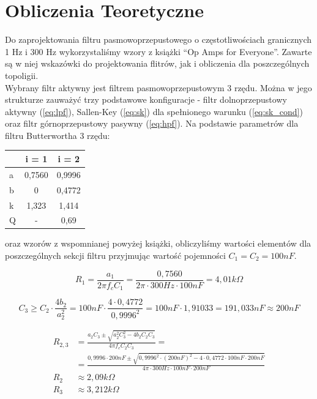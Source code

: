     \section{Obliczenia Teoretyczne}
    \label{sec:calculations}
Do zaprojektowania filtru pasmowoprzepustowego o częstotliwościach 
granicznych 1 Hz i 300 Hz wykorzystaliśmy wzory z książki ``Op Amps for 
Everyone''\cite{SLOA088}. Zawarte są w niej wskazówki do projektowania 
flitrów, jak i obliczenia dla poszczególnych topoligii. \\

Wybrany filtr aktywny jest filtrem pasmowoprzepustowym 3 rzędu. Można 
w jego strukturze zauważyć trzy podstawowe konfiguracje - filtr 
dolnoprzepustowy aktywny (\ref{eq:lpf}), Sallen-Key (\ref{eq:sk}) 
dla spełnionego warunku (\ref{eq:sk_cond}) 
oraz filtr górnoprzepustowy pasywny (\ref{eq:hpf}). 
Na podstawie parametrów dla filtru Butterwortha 3 rzędu: 
\begin{table}[H]
\centering
\renewcommand{\arraystretch}{1.2}
\begin{tabular}{|l|c|c|}
\hline
\textbf{} & \textbf{i = 1} & \textbf{i = 2} \\
\hline
a & 0,7560 & 0,9996 \\
\hline
b & 0 & 0,4772 \\
\hline
k & 1,323 & 1,414 \\
\hline
Q & - & 0,69 \\
\hline
\end{tabular}
\end{table}
oraz wzorów z wspomnianej powyżej książki, obliczyliśmy wartości
elementów dla poszczególnych sekcji filtru przyjmując wartość pojemności
$C_1 = C_2 = 100 nF$.

\begin{equation}
\label{eq:lpf}
R_{1} = 
\frac{a_1}{2 \pi f_c C_1}
 = 
\frac{0,7560}{2 \pi \cdot 300Hz \cdot 100nF}
 = 
4,01 k\Omega
\end{equation}

\begin{equation}
\label{eq:sk_cond}
C_3 \geq 
C_2 \cdot \frac{4b_2}{a_2^2}
 = 
100nF \cdot \frac{4 \cdot 0,4772}{0,9996^2}
 = 
100 nF \cdot 1,91033
 = 
191,033 nF \approx 200 nF
\end{equation}

\begin{equation}
\label{eq:sk}
\begin{aligned}
R_{2,3} &= 
\frac{a_2 C_3 \pm \sqrt{a_2^2 C_3^2 - 4b_2 C_2 C_3}}{4 \pi f_c C_2 C_3}
 = \\ &= 
\frac{0,9996 \cdot 200nF \pm \sqrt{0,9996^2 \cdot (200nF)^2 - 
4 \cdot 0,4772 \cdot 100nF \cdot 200nF}}
{4 \pi \cdot 300Hz \cdot 100nF \cdot 200nF} \\
R_2 &\approx 2,09 k\Omega \\
R_3 &\approx 3,212 k\Omega
\end{aligned}
\end{equation}

